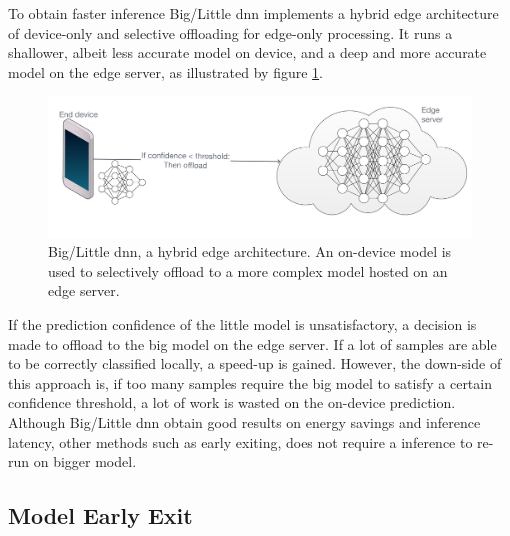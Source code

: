 To obtain faster inference Big/Little \gls{dnn} \cite{park_big/little_2015} implements a hybrid edge architecture of device-only and selective offloading for edge-only processing. It runs a shallower, albeit less accurate model on device, and a deep and more accurate model on the edge server, as illustrated by figure \ref{fig:big/little-dnn}. 

\begin{figure}
	\centering
	\includegraphics[width=\linewidth]{figures/models/big_little_dnn}
	\caption[Big/Little \gls{dnn} architecture]{Big/Little \gls{dnn}, a hybrid edge architecture. An on-device model is used to selectively offload to a more complex model hosted on an edge server.}
	\label{fig:big/little-dnn}
\end{figure}

If the prediction confidence of the little model is unsatisfactory, a decision is made to offload to the big model on the edge server. If a lot of samples are able to be correctly classified locally, a speed-up is gained. However, the down-side of this approach is, if too many samples require the big model to satisfy a certain confidence threshold, a lot of work is wasted on the on-device prediction. Although Big/Little \gls{dnn} obtain good results on energy savings and inference latency, other methods such as early exiting, does not require a inference to re-run on bigger model.

\subsection{Model Early Exit}

